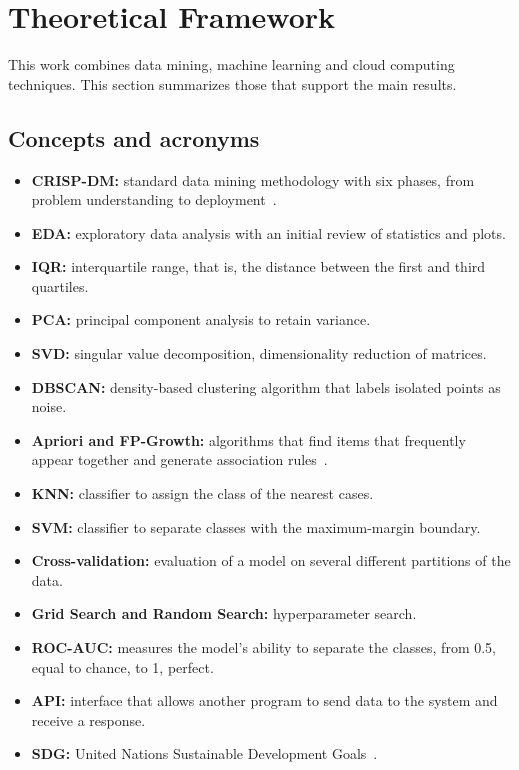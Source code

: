 \documentclass[conference,a4paper]{IEEEtran}
\begin{document}
\section{Theoretical Framework}

This work combines data mining, machine learning and cloud computing techniques. This section summarizes those that support the main results.

\subsection{Concepts and acronyms}

\begin{itemize}
\item \textbf{CRISP-DM:} standard data mining methodology with six phases, from problem understanding to deployment~\cite{wirth2000}.
\item \textbf{EDA:} exploratory data analysis with an initial review of statistics and plots.
\item \textbf{IQR:} interquartile range, that is, the distance between the first and third quartiles.
\item \textbf{PCA:} principal component analysis to retain variance.
\item \textbf{SVD:} singular value decomposition, dimensionality reduction of matrices.
\item \textbf{DBSCAN:} density-based clustering algorithm that labels isolated points as noise.
\item \textbf{Apriori and FP-Growth:} algorithms that find items that frequently appear together and generate association rules~\cite{agrawal1994,han2000}.
\item \textbf{KNN:} classifier to assign the class of the nearest cases.
\item \textbf{SVM:} classifier to separate classes with the maximum-margin boundary.
\item \textbf{Cross-validation:} evaluation of a model on several different partitions of the data.
\item \textbf{Grid Search and Random Search:} hyperparameter search.
\item \textbf{ROC-AUC:} measures the model's ability to separate the classes, from 0.5, equal to chance, to 1, perfect.
\item \textbf{API:} interface that allows another program to send data to the system and receive a response.
\item \textbf{SDG:} United Nations Sustainable Development Goals~\cite{un2015}.
\end{itemize}
\end{document}
